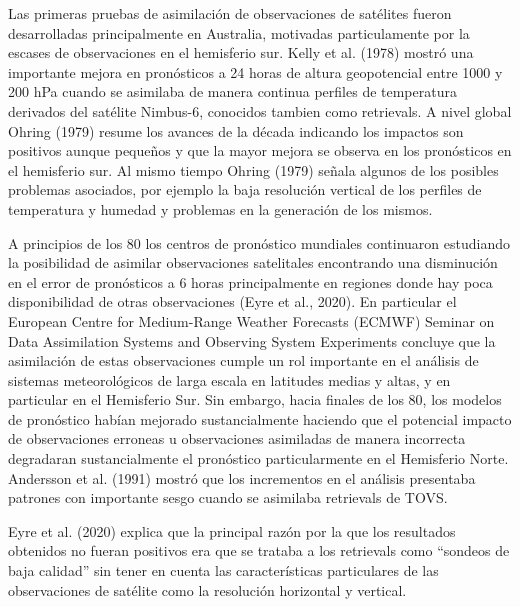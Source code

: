 \documentclass[12pt,twoside]{reedthesis}
\begin{document}
Las primeras pruebas de asimilación de observaciones de satélites fueron desarrolladas principalmente en Australia, motivadas particulamente por la escases de observaciones en el hemisferio sur. Kelly et al. (1978) mostró una importante mejora en pronósticos a 24 horas de altura geopotencial entre 1000 y 200 hPa cuando se asimilaba de manera continua perfiles de temperatura derivados del satélite Nimbus-6, conocidos tambien como retrievals. A nivel global Ohring (1979) resume los avances de la década indicando los impactos son positivos aunque pequeños y que la mayor mejora se observa en los pronósticos en el hemisferio sur. Al mismo tiempo Ohring (1979) señala algunos de los posibles problemas asociados, por ejemplo la baja resolución vertical de los perfiles de temperatura y humedad y problemas en la generación de los mismos.

A principios de los 80 los centros de pronóstico mundiales continuaron estudiando la posibilidad de asimilar observaciones satelitales encontrando una disminución en el error de pronósticos a 6 horas principalmente en regiones donde hay poca disponibilidad de otras observaciones (Eyre et al., 2020). En particular el European Centre for Medium-Range Weather Forecasts (ECMWF) Seminar on Data Assimilation Systems and Observing System Experiments concluye que la asimilación de estas observaciones cumple un rol importante en el análisis de sistemas meteorológicos de larga escala en latitudes medias y altas, y en particular en el Hemisferio Sur. Sin embargo, hacia finales de los 80, los modelos de pronóstico habían mejorado sustancialmente haciendo que el potencial impacto de observaciones erroneas u observaciones asimiladas de manera incorrecta degradaran sustancialmente el pronóstico particularmente en el Hemisferio Norte. Andersson et al. (1991) mostró que los incrementos en el análisis presentaba patrones con importante sesgo cuando se asimilaba retrievals de TOVS.

Eyre et al. (2020) explica que la principal razón por la que los resultados obtenidos no fueran positivos era que se trataba a los retrievals como ``sondeos de baja calidad'' sin tener en cuenta las características particulares de las observaciones de satélite como la resolución horizontal y vertical.
\end{document}
